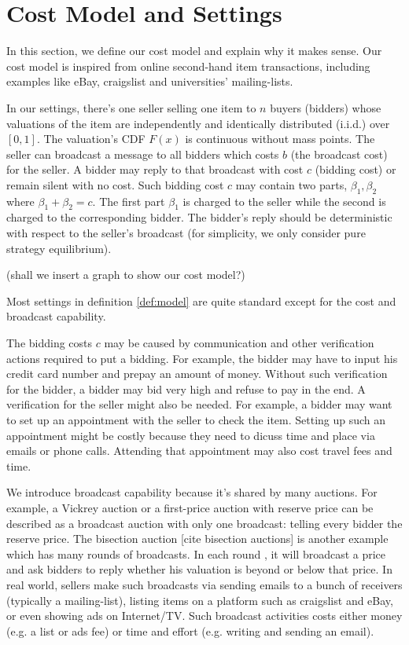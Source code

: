 \section{Cost Model and Settings}

In this section, we define our cost model and explain why it makes sense. Our
cost model is inspired from online second-hand item transactions, including
examples like eBay, craigslist and universities' mailing-lists.


\begin{definition}\label{def:model}

In our settings, there's one seller selling one item to $n$ buyers (bidders)
whose valuations of the item are independently and identically distributed
(i.i.d.) over $[0, 1]$.  The valuation's CDF $F(x)$ is continuous without mass
points.  The seller can broadcast a message to all bidders which costs $b$ (the
broadcast cost) for the seller.  A bidder may reply to that broadcast with cost
$c$ (bidding cost) or remain silent with no cost. Such bidding cost $c$ may
contain two parts, $\beta_1, \beta_2$ where $\beta_1+\beta_2 = c$.  The first
part $\beta_1$ is charged to the seller while the second is charged to the
corresponding bidder. The bidder's reply should be deterministic with respect
to the seller's broadcast (for simplicity, we only consider pure strategy
equilibrium).

\end{definition}

(shall we insert a graph to show our cost model?)

Most settings in definition \ref{def:model} are quite standard except for the
cost and broadcast capability.

The bidding costs $c$ may be caused by communication and other verification
actions required to put a bidding. For example, the bidder may have to input
his credit card number and prepay an amount of money. Without such verification
for the bidder, a bidder may bid very high and refuse to pay in the end. A
verification for the seller might also be needed. For example, a bidder may
want to set up an appointment with the seller to check the item.  Setting up
such an appointment might be costly because they need to dicuss time and place
via emails or phone calls.  Attending that appointment may also cost travel
fees and time. 

We introduce broadcast capability because it's shared by many auctions.  For
example, a Vickrey auction or a first-price auction with reserve price can be
described as a broadcast auction with only one broadcast: telling every bidder
the reserve price. The bisection auction [cite bisection auctions] is another
example which has many rounds of broadcasts. In each round , it will broadcast
a price and ask bidders to reply whether his valuation is beyond or below that
price.  In real world, sellers make such broadcasts via sending emails to a
bunch of receivers (typically a mailing-list), listing items on a platform such
as craigslist and eBay, or even showing ads on Internet/TV. Such broadcast
activities costs either money (e.g. a list or ads fee) or time and effort (e.g.
writing and sending an email).

